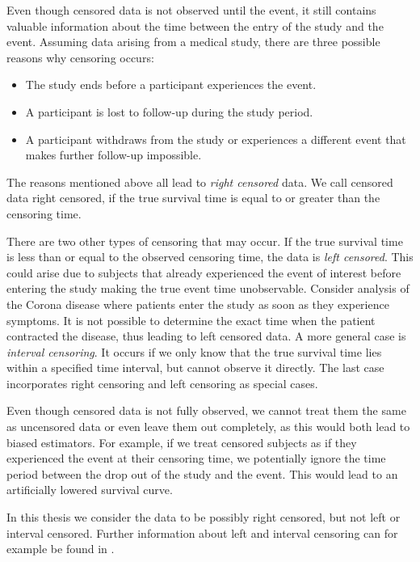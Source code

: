 \documentclass[12pt, a4paper]{scrartcl}
\theoremstyle{definition}
\theoremstyle{plain}
\numberwithin{equation}{section}
\numberwithin{figure}{section}
\numberwithin{table}{section}
\begin{document}
	Even though censored data is not observed until the event, it still contains valuable information about the time between the entry of the study and the event.
	Assuming data arising from a medical study, there are three possible reasons why censoring occurs:
	\begin{itemize}
		\item The study ends before a participant experiences the event.
		\item A participant is lost to follow-up during the study period. %
		\item A participant withdraws from the study or experiences a different event that makes further follow-up impossible.
	\end{itemize}

	The reasons mentioned above all lead to \emph{right censored} data.
	We call censored data right censored, if the true survival time is equal to or greater than the censoring time.
	
	There are two other types of censoring that may occur.
	If the true survival time is less than or equal to the observed censoring time, the data is \emph{left censored}.
	This could arise due to subjects that already experienced the event of interest before entering the study making the true event time unobservable.
	Consider analysis of the Corona disease where patients enter the study as soon as they experience symptoms.
	It is not possible to determine the exact time when the patient contracted the disease, thus leading to left censored data.
	A more general case is \emph{interval censoring}.
	It occurs if we only know that the true survival time lies within a specified time interval, but cannot observe it directly.
	The last case incorporates right censoring and left censoring as special cases.
	
	Even though censored data is not fully observed, we cannot treat them the same as uncensored data or even leave them out completely, as this would both lead to biased estimators.
	For example, if we treat censored subjects as if they experienced the event at their censoring time, we potentially ignore the time period between the drop out of the study and the event.
	This would lead to an artificially lowered survival curve.
		
	In this thesis we consider the data to be possibly right censored, but not left or interval censored.
	Further information about left and interval censoring can for example be found in \citet*{bookfailuretime}.
	
\end{document}
